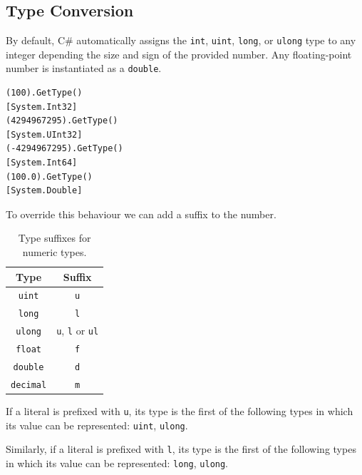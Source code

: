 \documentclass{article}
\def\customlinemarker#1#2{
    \edef\thelstnumber{%
        \unexpanded{%
            \ifnum#1=\value{lstnumber}\relax
              #2%
            \fi}%
        \ifx\thelstnumber\relax\else
        \expandafter\unexpanded\expandafter{\thelstnumber}%
        \fi
    }
}
\begin{document}
\subsection{Type Conversion}
By default, C\# automatically assigns the \lstinline{int}, \lstinline{uint},
\lstinline{long}, or \lstinline{ulong} type to any integer \linebreak depending the size and sign
of the provided number. Any floating-point number is instantiated as a \lstinline{double}.
\begingroup
\let\thelstnumber\relax
\customlinemarker{1}{\$}
\customlinemarker{3}{\$}
\customlinemarker{5}{\$}
\customlinemarker{7}{\$}
\begin{lstlisting}
(100).GetType()
[System.Int32]
(4294967295).GetType()    
[System.UInt32]
(-4294967295).GetType()
[System.Int64]
(100.0).GetType()
[System.Double]
\end{lstlisting}
\endgroup
To override this behaviour we can add a suffix to the number.
\begin{table}[H]
    \centering
    \begin{tabular}{c c}
        \toprule
        \textbf{Type} & \textbf{Suffix}                                      \\
        \midrule
        \lstinline!uint!    & \lstinline!u!                                  \\
        \lstinline!long!    & \lstinline!l!                                  \\
        \lstinline!ulong!   & \lstinline!u!, \lstinline!l! or \lstinline!ul! \\
        \midrule
        \lstinline!float!   & \lstinline!f!                                  \\
        \lstinline!double!  & \lstinline!d!                                  \\
        \lstinline!decimal! & \lstinline!m!                                  \\
        \bottomrule
    \end{tabular}
    \caption{Type suffixes for numeric types.}
\end{table}
If a literal is prefixed with \lstinline{u}, its type is the first
of the following types in which its value can be represented:
\lstinline{uint}, \lstinline{ulong}.

Similarly, if a literal is prefixed with \lstinline{l}, its type is the first
of the following types in which its value can be represented:
\lstinline{long}, \lstinline{ulong}.
\end{document}
